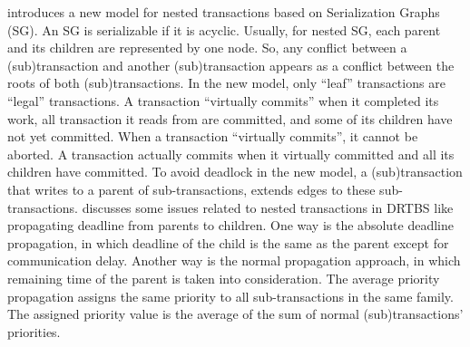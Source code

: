 \documentclass[10pt, conference, compsocconf]{IEEEtran}
\begin{document}
\cite{620423} introduces a new model for nested transactions based on Serialization Graphs (SG). 
An SG is serializable if it is acyclic. Usually, for nested SG, each parent and its children are represented by one node. So, any conflict between a (sub)transaction and another (sub)transaction appears as a conflict between the roots of both (sub)transactions. 
In the new model, only ``leaf'' transactions are ``legal'' transactions. 
A transaction ``virtually commits'' when it completed its work, all transaction it reads from are committed, and some of its children have not yet committed. When a transaction ``virtually commits'', it cannot be aborted. A transaction actually commits when it virtually committed and all its children have committed. 
To avoid deadlock in the new model, a (sub)transaction that writes to a parent of sub-transactions, extends edges to these sub-transactions. 
%
\cite{316159} discusses some issues related to nested transactions in DRTBS like propagating deadline from parents to children. 
One way is the absolute deadline propagation, in which deadline of the child is the same as the parent except for communication delay. 
Another way is the normal propagation approach, in which remaining time of the parent is taken into consideration. 
The average priority propagation assigns the same priority to all sub-transactions in the same family. The assigned priority value is the average of the sum of normal (sub)transactions' priorities.
\end{document}
